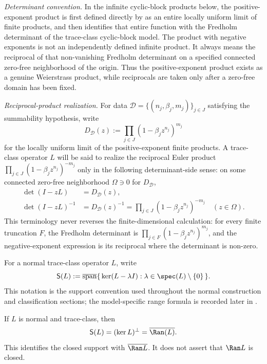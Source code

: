 \noindent\emph{Determinant convention.}
In the infinite cyclic-block products below, the positive-exponent product
is first defined directly by
 as an entire locally uniform
limit of finite products, and 
then identifies that entire function with the Fredholm determinant of the
trace-class cyclic-block model. The product with negative exponents is not
an independently defined infinite product. It always means the reciprocal
of that non-vanishing Fredholm determinant on a specified connected
zero-free neighborhood of the origin. Thus the positive-exponent product
exists as a genuine Weierstrass product, while reciprocals are taken only
after a zero-free domain has been fixed.

\noindent\emph{Reciprocal-product realization.}
For data \(\mathcal D=\{(n_j,\beta_j,m_j)\}_{j\in J}\) satisfying the
summability hypothesis, write
\[
  D_{\mathcal D}(z):=\prod_{j\in J}(1-\beta_j z^{n_j})^{m_j}
\]
for the locally uniform limit of the positive-exponent finite products.
A trace-class operator \(L\) will be said to realize the reciprocal Euler
product
\(\prod_{j\in J}(1-\beta_j z^{n_j})^{-m_j}\) only in the following
determinant-side sense: on some connected zero-free neighborhood
\(\Omega\ni0\) for \(D_{\mathcal D}\),
\[
  \begin{aligned}
    \det(I-zL)&=D_{\mathcal D}(z),\\
    \det(I-zL)^{-1}
      &=D_{\mathcal D}(z)^{-1}
        =\prod_{j\in J}(1-\beta_j z^{n_j})^{-m_j}
        \quad (z\in\Omega).
  \end{aligned}
\]
This terminology never reverses the finite-dimensional calculation:
for every finite truncation \(F\), the Fredholm determinant is
\(\prod_{j\in F}(1-\beta_j z^{n_j})^{m_j}\), and the negative-exponent
expression is its reciprocal where the determinant is non-zero.

\begin{definition}
  \label{def:closed-nonzero-support}
For a normal trace-class operator \(L\), write
\[
  \mathsf S(L):=
  \overline{\mathrm{span}}
  \{\,\ker(L-\lambda I):\lambda\in\spec(L)\setminus\{0\}\,\}.
\]
This notation is the support convention used throughout the normal
construction and classification sections; the model-specific range formula
is recorded later in .
\end{definition}

\begin{lemma}
  \label{lem:normal-support-range-closure}
  If \(L\) is normal and trace-class, then
  \[
    \mathsf S(L)=(\ker L)^\perp=\overline{\Ran(L)}.
  \]
  This identifies the closed support with \(\overline{\Ran L}\). It does
  not assert that \(\Ran L\) is closed.
\end{lemma}


